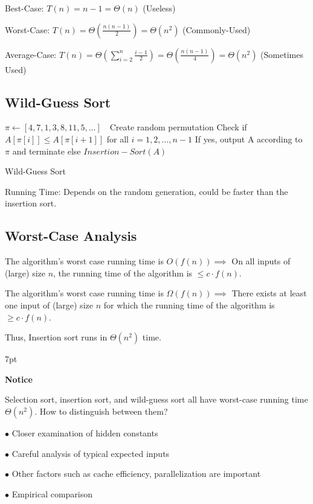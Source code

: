 \documentclass[10pt]{article}
\newenvironment{formal}[2]{%
	\def\FrameCommand{%
		\hspace{1pt}%
		{\color{#1}\vrule width 2pt}%
		{\color{#2}\vrule width 4pt}%
		\colorbox{#2}%
	}%
	\MakeFramed{\advance\hsize-\width\FrameRestore}%
	\noindent\hspace{-4.55pt}%
	\begin{adjustwidth}{}{7pt}%
		\vspace{2pt}\vspace{2pt}%
	}
	{%
		\vspace{2pt}\end{adjustwidth}\endMakeFramed%
}
\begin{document}
Best-Case: $T(n) = n-1 = \Theta(n)$ (Useless)

Worst-Case: $T(n) = \Theta(\frac{n(n-1)}{2}) = \Theta(n^2)$ (Commonly-Used)

Average-Case: $T(n) = \Theta(\sum_{i=2}^n \frac{i-1}{2}) = \Theta(\frac{n(n-1)}{4}) = \Theta(n^2)$ (Sometimes Used)

\subsection{Wild-Guess Sort}

\begin{algorithm}
	\SetAlgoLined
	$\pi \gets [4,7,1,3,8,11,5,...]$\ \ Create random permutation
	Check if $A[\pi[i]] \leq A[\pi[i+1]]$ for all $i = 1,2,...,n-1$
	If yes, output A according to $\pi$ and terminate
	else $Insertion-Sort(A)$
	\caption{Wild-Guess Sort}
\end{algorithm}

Running Time: Depends on the random generation, could be faster than the insertion sort.

\subsection{Worst-Case Analysis}

The algorithm’s worst case running time is $O(f(n)) \implies $ On all inputs of (large) size $n$, the running time of the algorithm is $\leq c \cdot f(n)$.

The algorithm’s worst case running time is $\Omega (f(n)) \implies $ There exists at least one input of (large) size $n$ for which the running time of the algorithm is  $\geq c \cdot f(n)$.

Thus, Insertion sort runs in $\Theta (n^2)$ time.

\begin{formal}{DarkBlue}{blueshade}
	
	\textbf{Notice}
	
	Selection sort, insertion sort, and wild-guess sort all have worst-case running time $\Theta (n^2)$. How to distinguish between them?
	
	$\bullet$ Closer examination of hidden constants
	
	$\bullet$ Careful analysis of typical expected inputs
	
	$\bullet$ Other factors such as cache efficiency, parallelization are important
	
	$\bullet$ Empirical comparison
	
\end{formal}
\end{document}
